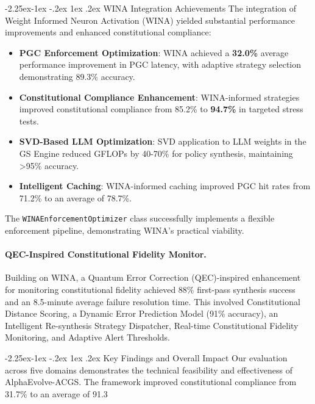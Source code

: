 \documentclass[manuscript,screen,9pt]{acmart}
\makeatletter
\renewcommand\subsection{\@startsection{subsection}{2}{\z@}%
  {-2.25ex\@plus -1ex \@minus -.2ex}%
  {1ex \@plus .2ex}%
  {\normalfont\large\bfseries}}
\makeatother
\begin{document}
\subsection{WINA Integration Achievements}
\label{subsec:wina_integration_achievements}
The integration of Weight Informed Neuron Activation (WINA) yielded substantial performance improvements and enhanced constitutional compliance:
\begin{itemize}[leftmargin=*,itemsep=1pt,parsep=1pt]
    \item \textbf{PGC Enforcement Optimization}: WINA achieved a \textbf{32.0\%} average performance improvement in PGC latency, with adaptive strategy selection demonstrating 89.3\% accuracy.
    \item \textbf{Constitutional Compliance Enhancement}: WINA-informed strategies improved constitutional compliance from 85.2\% to \textbf{94.7\%} in targeted stress tests.
    \item \textbf{SVD-Based LLM Optimization}: SVD application to LLM weights in the GS Engine reduced GFLOPs by 40-70\% for policy synthesis, maintaining >95\% accuracy.
    \item \textbf{Intelligent Caching}: WINA-informed caching improved PGC hit rates from 71.2\% to an average of 78.7\%.
\end{itemize}
The \texttt{WINAEnforcementOptimizer} class successfully implements a flexible enforcement pipeline, demonstrating WINA's practical viability.

\paragraph{QEC-Inspired Constitutional Fidelity Monitor.} Building on WINA, a Quantum Error Correction (QEC)-inspired enhancement for monitoring constitutional fidelity achieved 88\% first-pass synthesis success and an 8.5-minute average failure resolution time. This involved Constitutional Distance Scoring, a Dynamic Error Prediction Model (91\% accuracy), an Intelligent Re-synthesis Strategy Dispatcher, Real-time Constitutional Fidelity Monitoring, and Adaptive Alert Thresholds.

\subsection{Key Findings and Overall Impact}
Our evaluation across five domains demonstrates the technical feasibility and effectiveness of AlphaEvolve-ACGS. The framework improved constitutional compliance from 31.7\% to an average of 91.3%
\end{document}
